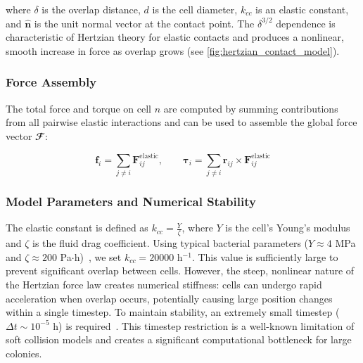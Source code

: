 \documentclass[conference]{IEEEtran}
\begin{document}
where $\delta$ is the overlap distance, $d$ is the cell diameter, $k_{cc}$ is an elastic constant, and $\hat{\mathbf{n}}$ is the unit normal vector at the contact point. The $\delta^{3/2}$ dependence is characteristic of Hertzian theory for elastic contacts and produces a nonlinear, smooth increase in force as overlap grows (see \autoref{fig:hertzian_contact_model}).

\subsubsection{Force Assembly}

The total force and torque on cell $n$ are computed by summing contributions from all pairwise elastic interactions and can be used to assemble the global force vector $\mathbfcal{F}$:

\begin{equation} \label{eq:force_assembly}
    \mathbf{f}_i         = \sum_{j \neq i} \mathbf{F}^{\text{elastic}}_{ij}, \qquad
    \boldsymbol{\tau}_i  = \sum_{j \neq i} \mathbf{r}_{ij} \times \mathbf{F}^{\text{elastic}}_{ij}
\end{equation}

\subsubsection{Model Parameters and Numerical Stability}

The elastic constant is defined as $k_{cc} = \frac{Y}{\zeta}$, where $Y$ is the cell's Young's modulus and $\zeta$ is the fluid drag coefficient. Using typical bacterial parameters ($Y \approx 4$ MPa and $\zeta \approx 200$ Pa$\cdot$h)~\cite{You2018, Blanchard2015}, we set $k_{cc} = 20000$ h$^{-1}$. This value is sufficiently large to prevent significant overlap between cells. However, the steep, nonlinear nature of the Hertzian force law creates numerical stiffness: cells can undergo rapid acceleration when overlap occurs, potentially causing large position changes within a single timestep. To maintain stability, an extremely small timestep ($\Delta t \sim 10^{-5}$ h) is required~\cite{Khan_2024, You2018, Blanchard2015}. This timestep restriction is a well-known limitation of soft collision models and creates a significant computational bottleneck for large colonies.
\end{document}
